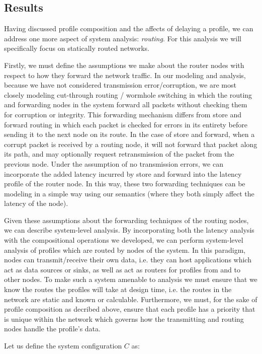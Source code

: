 \subsection{Results}
Having discussed profile composition and the affects of delaying a
profile, we can address one more aspect of system analysis:
\emph{routing}.  For this analysis we will specifically focus on
statically routed networks.

Firstly, we must define the assumptions we make about the router nodes
with respect to how they forward the network traffic.  In our modeling
and analysis, because we have not considered transmission
error/corruption, we are most closely modeling cut-through routing /
wormhole switching in which the routing and forwarding nodes in the
system forward all packets without checking them for corruption or
integrity.  This forwarding mechanism differs from store and forward
routing in which each packet is checked for errors in its entirety
before sending it to the next node on its route.  In the case of store
and forward, when a corrupt packet is received by a routing node, it
will not forward that packet along its path, and may optionally
request retransmission of the packet from the previous node.  Under
the assumption of no transmission errors, we can incorporate the added
latency incurred by store and forward into the latency profile of the
router node.  In this way, these two forwarding techniques can be
modeling in a simple way using our semantics (where they both simply
affect the latency of the node).  

Given these assumptions about the forwarding techniques of the routing
nodes, we can describe system-level analysis.  By incorporating both
the latency analysis with the compositional operations we developed,
we can perform system-level analysis of profiles which are routed by
nodes of the system.  In this paradigm, nodes can transmit/receive
their own data, i.e. they can host applications which act as data
sources or sinks, as well as act as routers for profiles from and to
other nodes.  To make such a system amenable to analysis we must
ensure that we know the routes the profiles will take at design time,
i.e. the routes in the network are static and known or calculable.
Furthermore, we must, for the sake of profile composition as decribed
above, ensure that each profile has a priority that is unique within
the network which governs how the transmitting and routing nodes
handle the profile's data.

Let us define the system configuration $C$ as:

